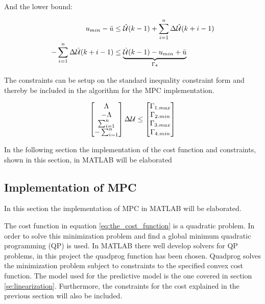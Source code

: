 And the lower bound:

 \begin{equation}
 \begin{aligned}
			 	u_{min} -  \bar{u} &\leq \hat{\CMcal{U}}(k-1)+\sum_{i=1}^n \Delta\hat{\CMcal{U}}(k+i-1) \\
-\sum_{i=1}^n \Delta\hat{\CMcal{U}}(k+i-1) &\leq \underbrace{\hat{\CMcal{U}}(k-1)-u_{min}+\bar{u}}_{\Gamma_4}
 \end{aligned}
 \end{equation}

The constraints can be setup on the standard inequality constraint form and thereby be included in the algorithm for the MPC implementation.

 \begin{equation}
        \begin{bmatrix}
           \Lambda\\
           -\Lambda\\
           \sum_{i=1}^n \\
           -\sum_{i=1}^n
           \end{bmatrix}
           \Delta\CMcal{U}
           \leq 
           \begin{bmatrix}
         \Gamma_{1.max}\\
         \Gamma_{2.min}\\
         \Gamma_{3.max}\\
         \Gamma_{4.min}

           \end{bmatrix}
 \end{equation}

 In the following section the implementation of the cost function and constraints, shown in this section, in MATLAB will be elaborated

\subsection{Implementation of MPC}\label{subse:implementation_mpc}
In this section the implementation of MPC in MATLAB will be elaborated. 

The cost function in equation \ref{eq:the_cost_function} is a quadratic problem. In order to solve this minimization problem and find a global minimum quadratic programming (QP) is used. In MATLAB there well develop solvers for QP problems, in this project the quadprog function has been chosen. Quadprog solves the minimization problem subject to constraints to the specified convex cost function. The model used for the predictive model is the one covered in section \ref{se:linearization}. Furthermore, the constraints for the cost explained in the previous section will also be included. 


